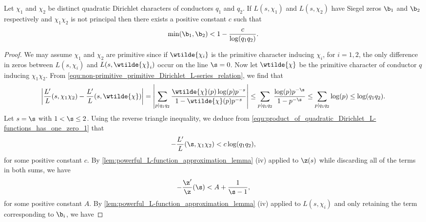     \begin{proposition}\label{prop:product_of_quadratic_Dirichlet_L-functions_has_one_zero}
      Let \(\chi_{1}\) and \(\chi_{2}\) be distinct quadratic Dirichlet characters of conductors \(q_{1}\) and \(q_{2}\). If \(L(s,\chi_{1})\) and \(L(s,\chi_{2})\) have Siegel zeros \(\b_{1}\) and \(\b_{2}\) respectively and \(\chi_{1}\chi_{2}\) is not principal then there exists a positive constant \(c\) such that
      \[
        \min(\b_{1},\b_{2}) < 1-\frac{c}{\log(q_{1}q_{2})}.
      \]
    \end{proposition}
    \begin{proof}
        We may assume \(\chi_{1}\) and \(\chi_{2}\) are primitive since if \(\wtilde{\chi_{i}}\) is the primitive character inducing \(\chi_{i}\), for \(i = 1,2\), the only difference in zeros between \(L(s,\chi_{i})\) and \(L(s,\wtilde{\chi}_{i})\) occur on the line \(\s = 0\). Now let \(\wtilde{\chi}\) be the primitive character of conductor \(q\) inducing \(\chi_{1}\chi_{2}\). From \cref{equ:non-primitive_primitive_Dirichlet_L-series_relation}, we find that
        \begin{equation}\label{equ:product_of_quadratic_Dirichlet_L-functions_has_one_zero_1}
          \left|\frac{L'}{L}(s,\chi_{1}\chi_{2})-\frac{L'}{L}(s,\wtilde{\chi})\right| = \left|\sum_{p \mid q_{1}q_{2}}\frac{\wtilde{\chi}(p)\log(p)p^{-s}}{1-\wtilde{\chi}(p)p^{-s}}\right| \le \sum_{p \mid q_{1}q_{2}}\frac{\log(p)p^{-\s}}{1-p^{-\s}} \le \sum_{p \mid q_{1}q_{2}}\log(p) \le \log(q_{1}q_{2}).
        \end{equation}
        Let \(s = \s\) with \(1 < \s \le 2\). Using the reverse triangle inequality, we deduce from \cref{equ:product_of_quadratic_Dirichlet_L-functions_has_one_zero_1} that
        \begin{equation}\label{equ:product_of_quadratic_Dirichlet_L-functions_has_one_zero_2}
          -\frac{L'}{L}(\s,\chi_{1}\chi_{2}) < c\log(q_{1}q_{2}),
        \end{equation}
        for some positive constant \(c\).
        By \cref{lem:powerful_L-function_approximation_lemma} (iv) applied to \(\z(s)\) while discarding all of the terms in both sums, we have
        \begin{equation}\label{equ:product_of_quadratic_Dirichlet_L-functions_has_one_zero_3}
          -\frac{\z'}{\z}(\s) < A+\frac{1}{\s-1},
        \end{equation}
        for some positive constant \(A\). By \cref{lem:powerful_L-function_approximation_lemma} (iv) applied to \(L(s,\chi_{i})\) and only retaining the term corresponding to \(\b_{i}\), we have

\end{proof}
